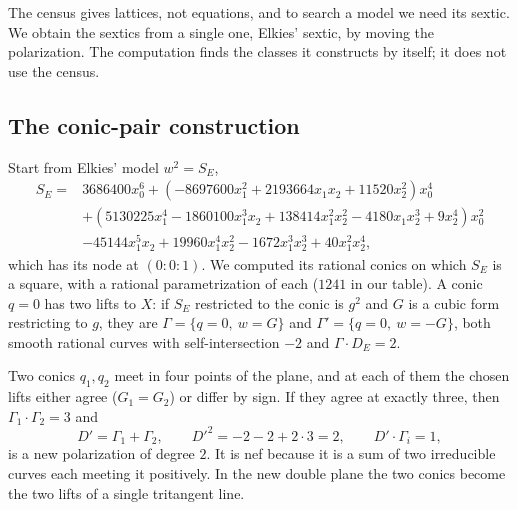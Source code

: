 \documentclass[11pt]{article}
\newcommand{\X}{X}
\theoremstyle{remark}
\begin{document}
The census gives lattices, not equations, and to search a model we need its sextic.  We obtain the sextics from a single one,
Elkies' sextic, by moving the polarization.  The computation finds the classes it constructs by itself; it does not use the
census.

\subsection*{The conic-pair construction}
Start from Elkies' model $w^2=S_E$,
\begin{align*}
S_E={}&3686400x_0^6+(-8697600x_1^2+2193664x_1x_2+11520x_2^2)x_0^4\\
&+(5130225x_1^4-1860100x_1^3x_2+138414x_1^2x_2^2-4180x_1x_2^3+9x_2^4)x_0^2\\
&-45144x_1^5x_2+19960x_1^4x_2^2-1672x_1^3x_2^3+40x_1^2x_2^4 ,
\end{align*}
which has its node at $(0:0:1)$.  We computed its rational conics on which $S_E$ is a square, with a rational
parametrization of each ($1241$ in our table).  A conic $q=0$ has two lifts to $\X$: if $S_E$ restricted to the conic is
$g^2$ and $G$ is a cubic form restricting to $g$, they are $\Gamma=\{q=0,\ w=G\}$ and $\Gamma'=\{q=0,\ w=-G\}$, both smooth
rational curves with self-intersection $-2$ and $\Gamma\cdot D_E=2$.

Two conics $q_1,q_2$ meet in four points of the plane, and at each of them the chosen lifts either agree ($G_1=G_2$) or
differ by sign.  If they agree at exactly three, then $\Gamma_1\cdot\Gamma_2=3$ and
\[
D'=\Gamma_1+\Gamma_2,\qquad D'^2=-2-2+2\cdot 3=2,\qquad D'\cdot\Gamma_i=1,
\]
is a new polarization of degree $2$.  It is nef because it is a sum of two irreducible curves each meeting it positively.
In the new double plane the two conics become the two lifts of a single tritangent line.
\end{document}
